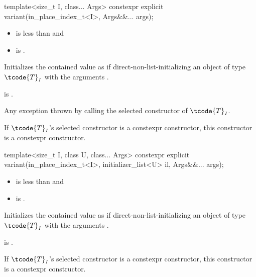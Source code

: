 %
\begin{itemdecl}
template<size_t I, class... Args> constexpr explicit variant(in_place_index_t<I>, Args&&... args);
\end{itemdecl}

\begin{itemdescr}
\pnum
\constraints
\begin{itemize}
\item
{} is less than  and
\item
{} is .
\end{itemize}

\pnum
\effects
Initializes the contained value as if direct-non-list-initializing
an object of type $\tcode{T}_I$
with the arguments .

\pnum
\ensures
{} is .

\pnum
\throws
Any exception thrown by calling the selected constructor of $\tcode{T}_I$.

\pnum
\remarks
If $\tcode{T}_I$'s selected constructor is a constexpr constructor, this
constructor is a constexpr constructor.
\end{itemdescr}

%
\begin{itemdecl}
template<size_t I, class U, class... Args>
  constexpr explicit variant(in_place_index_t<I>, initializer_list<U> il, Args&&... args);
\end{itemdecl}

\begin{itemdescr}
\pnum
\constraints
\begin{itemize}
\item
{} is less than  and
\item
{} is .
\end{itemize}

\pnum
\effects
Initializes the contained value as if direct-non-list-initializing
an object of type $\tcode{T}_I$
with the arguments .

\pnum
\ensures
{} is .

\pnum
\remarks
If $\tcode{T}_I$'s selected constructor is a constexpr constructor, this
constructor is a constexpr constructor.
\end{itemdescr}

